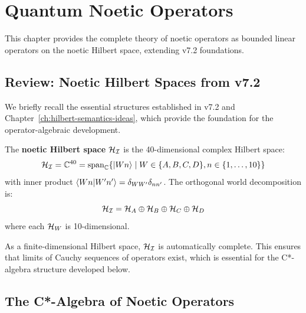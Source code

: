 \chapter{Quantum Noetic Operators}
\label{ch:quantum-noetic-operators}

\begin{tcolorbox}[colback=blue!5!white,colframe=blue!75!black,title=\vnewthree]
This chapter provides the complete theory of noetic operators as bounded linear operators on the noetic Hilbert space, extending v7.2 foundations.
\end{tcolorbox}

\section{Review: Noetic Hilbert Spaces from v7.2}
\label{sec:review-hilbert}

We briefly recall the essential structures established in v7.2 and Chapter~\ref{ch:hilbert-semantics-ideas}, which provide the foundation for the operator-algebraic development.

\begin{definition}
\label{def:noetic-hilbert-recap}
The \textbf{noetic Hilbert space} $\mathcal{H}_{\mathcal{I}}$ is the 40-dimensional complex Hilbert space:
\[
\mathcal{H}_{\mathcal{I}} = \mathbb{C}^{40} = \mathrm{span}_{\mathbb{C}}\{|Wn\rangle \mid W \in \{A,B,C,D\}, n \in \{1,\ldots,10\}\}
\]
with inner product $\langle Wn | W'n' \rangle = \delta_{WW'}\delta_{nn'}$. The orthogonal world decomposition is:
\[
\mathcal{H}_{\mathcal{I}} = \mathcal{H}_A \oplus \mathcal{H}_B \oplus \mathcal{H}_C \oplus \mathcal{H}_D
\]
where each $\mathcal{H}_W$ is 10-dimensional.
\end{definition}

\begin{remark}[Completeness]
\label{rem:completeness}
As a finite-dimensional Hilbert space, $\mathcal{H}_{\mathcal{I}}$ is automatically complete. This ensures that limits of Cauchy sequences of operators exist, which is essential for the C*-algebra structure developed below.
\end{remark}

\section{The C*-Algebra of Noetic Operators}
\label{sec:cstar-algebra}

